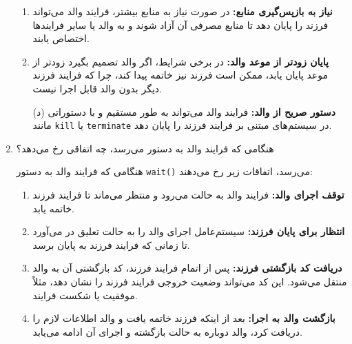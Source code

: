 \begin{enumerate}
\begin{qsolve}
\begin{enumerate}
			\item 
			\textbf{نیاز به بازپس‌گیری منابع:} در صورت نیاز به منابع بیشتر، فرایند والد می‌تواند فرزند را پایان دهد تا منابع مصرفی آن آزاد شوند و به والد یا سایر فرایندها اختصاص یابند.
			
			\item 
			\textbf{پایان زودتر از موعد والد:} در برخی شرایط، اگر والد تصمیم بگیرد زودتر از موعد پایان یابد، ممکن است فرزند نیز خاتمه پیدا کند، چرا که فرایند فرزند دیگر بدون والد قابل اجرا نیست.
		\end{enumerate}
	\end{qsolve}
	
	\begin{qsolve}
		\begin{enumerate}
			\item [(د)]
			\textbf{دستور صریح از والد:} فرایند والد می‌تواند به طور مستقیم و با دستوراتی مانند \texttt{kill} یا \texttt{terminate} در سیستم‌های مبتنی بر  فرایند فرزند را پایان دهد.
		\end{enumerate}
	\end{qsolve}
	
	
	
	
	\item 
	هنگامی که فرایند والد به دستور  می‌رسد، چه اتفاقی رخ می‌دهد؟
	\begin{qsolve}
		هنگامی که فرایند والد به دستور \texttt{wait()} می‌رسد، اتفاقات زیر رخ می‌دهند:
		\begin{enumerate}
			\item 
			\textbf{توقف اجرای والد:} فرایند والد به حالت  می‌رود و منتظر می‌ماند تا فرایند فرزند خاتمه یابد.
			
			\item 
			\textbf{انتظار برای پایان فرزند:} سیستم‌عامل اجرای والد را به حالت تعلیق در می‌آورد تا زمانی که فرایند فرزند به پایان برسد.
			
			\item 
			\textbf{دریافت کد بازگشتی فرزند:} پس از اتمام فرایند فرزند، کد بازگشتی آن به والد منتقل می‌شود. این کد می‌تواند وضعیت خروجی فرایند فرزند را نشان دهد، مثلاً موفقیت یا شکست فرایند.
			
			\item 
			\textbf{بازگشت والد به اجرا:} بعد از اینکه فرزند خاتمه یافت و والد اطلاعات لازم را دریافت کرد، والد دوباره به حالت  بازگشته و اجرای آن ادامه می‌یابد.
		\end{enumerate}
	\end{qsolve}
\end{enumerate}


